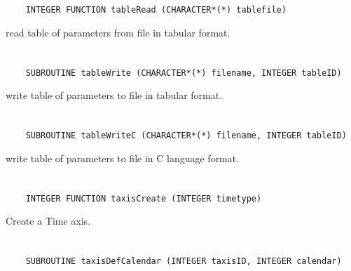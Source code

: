 \section*{\tt {}}

\begin{verbatim}
    INTEGER FUNCTION tableRead (CHARACTER*(*) tablefile)
\end{verbatim}

read table of parameters from file in tabular format.


\section*{\tt {}}

\begin{verbatim}
    SUBROUTINE tableWrite (CHARACTER*(*) filename, INTEGER tableID)
\end{verbatim}

write table of parameters to file in tabular format.


\section*{\tt {}}

\begin{verbatim}
    SUBROUTINE tableWriteC (CHARACTER*(*) filename, INTEGER tableID)
\end{verbatim}

write table of parameters to file in C language format.


\section*{\tt {}}

\begin{verbatim}
    INTEGER FUNCTION taxisCreate (INTEGER timetype)
\end{verbatim}

Create a Time axis.


\section*{\tt {}}

\begin{verbatim}
    SUBROUTINE taxisDefCalendar (INTEGER taxisID, INTEGER calendar)
\end{verbatim}

